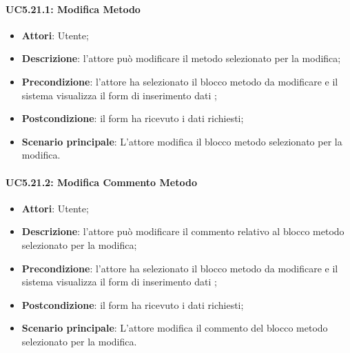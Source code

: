 \begin{itemize}
\begin{itemize}
\begin{itemize}
\begin{itemize}
\paragraph{UC5.21.1: Modifica Metodo}
\label{UC5.21.1}
\begin{itemize}
	\item \textbf{Attori}: Utente;
	\item \textbf{Descrizione}: l'attore può modificare il metodo selezionato per la modifica;
	\item \textbf{Precondizione}: l'attore ha selezionato il blocco metodo da modificare e il sistema visualizza il form di inserimento dati ;
	\item \textbf{Postcondizione}: il form ha ricevuto i dati richiesti;
	\item \textbf{Scenario principale}: L'attore modifica il blocco metodo selezionato per la modifica.
\end{itemize}

\paragraph{UC5.21.2: Modifica Commento Metodo}
\label{UC5.21.2}
\begin{itemize}
	\item \textbf{Attori}: Utente;
	\item \textbf{Descrizione}: l'attore può modificare il commento relativo al blocco metodo selezionato per la modifica;
	\item \textbf{Precondizione}: l'attore ha selezionato il blocco metodo da modificare e il sistema visualizza il form di inserimento dati ;
	\item \textbf{Postcondizione}: il form ha ricevuto i dati richiesti;
	\item \textbf{Scenario principale}: L'attore modifica il commento del blocco metodo selezionato per la modifica.
\end{itemize}


\end{itemize}
\end{itemize}
\end{itemize}
\end{itemize}
